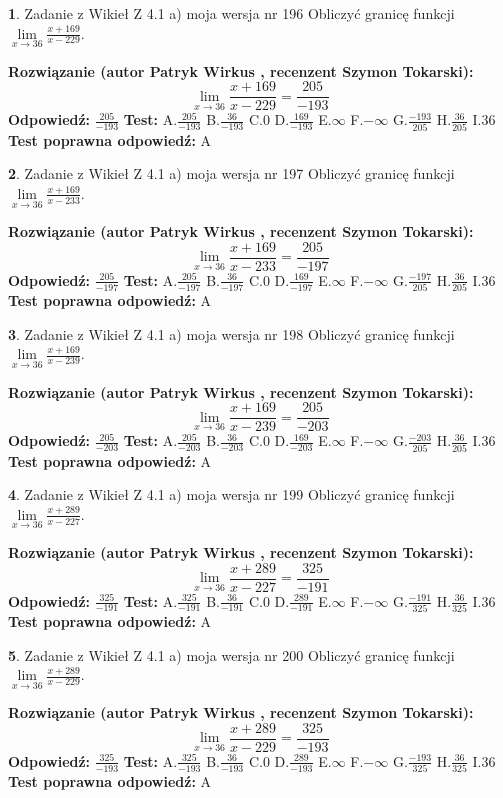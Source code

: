 \documentclass[12pt, a4paper]{article}
\theoremstyle{definition} %
\newtheorem{zad}{}
\newcommand{\zadStart}[1]{\begin{zad}#1\newline}
\newcommand{\zadStop}{\end{zad}}
\newcommand{\rozwStart}[2]{\noindent \textbf{Rozwiązanie (autor #1 , recenzent #2): }\newline}
\newcommand{\rozwStop}{\newline}
\newcommand{\odpStart}{\noindent \textbf{Odpowiedź:}\newline}
\newcommand{\odpStop}{\newline}
\newcommand{\testStart}{\noindent \textbf{Test:}\newline}
\newcommand{\testStop}{\newline}
\newcommand{\kluczStart}{\noindent \textbf{Test poprawna odpowiedź:}\newline}
\newcommand{\kluczStop}{\newline}
\begin{document}
\zadStart{Zadanie z Wikieł Z 4.1 a) moja wersja nr 196}
Obliczyć granicę funkcji $\lim\limits_{x\to36}\frac{x+169}{x-229}$.
\zadStop
\rozwStart{Patryk Wirkus}{Szymon Tokarski}
$$\lim\limits_{x\to36}\frac{x+169}{x-229} = \frac{205}{-193}$$
\rozwStop
\odpStart
$\frac{205}{-193}$
\odpStop
\testStart
A.$\frac{205}{-193}$
B.$\frac{36}{-193}$
C.$0$
D.$\frac{169}{-193}$
E.$\infty$
F.$-\infty$
G.$\frac{-193}{205}$
H.$\frac{36}{205}$
I.$36$
\testStop
\kluczStart
A
\kluczStop



\zadStart{Zadanie z Wikieł Z 4.1 a) moja wersja nr 197}
Obliczyć granicę funkcji $\lim\limits_{x\to36}\frac{x+169}{x-233}$.
\zadStop
\rozwStart{Patryk Wirkus}{Szymon Tokarski}
$$\lim\limits_{x\to36}\frac{x+169}{x-233} = \frac{205}{-197}$$
\rozwStop
\odpStart
$\frac{205}{-197}$
\odpStop
\testStart
A.$\frac{205}{-197}$
B.$\frac{36}{-197}$
C.$0$
D.$\frac{169}{-197}$
E.$\infty$
F.$-\infty$
G.$\frac{-197}{205}$
H.$\frac{36}{205}$
I.$36$
\testStop
\kluczStart
A
\kluczStop



\zadStart{Zadanie z Wikieł Z 4.1 a) moja wersja nr 198}
Obliczyć granicę funkcji $\lim\limits_{x\to36}\frac{x+169}{x-239}$.
\zadStop
\rozwStart{Patryk Wirkus}{Szymon Tokarski}
$$\lim\limits_{x\to36}\frac{x+169}{x-239} = \frac{205}{-203}$$
\rozwStop
\odpStart
$\frac{205}{-203}$
\odpStop
\testStart
A.$\frac{205}{-203}$
B.$\frac{36}{-203}$
C.$0$
D.$\frac{169}{-203}$
E.$\infty$
F.$-\infty$
G.$\frac{-203}{205}$
H.$\frac{36}{205}$
I.$36$
\testStop
\kluczStart
A
\kluczStop



\zadStart{Zadanie z Wikieł Z 4.1 a) moja wersja nr 199}
Obliczyć granicę funkcji $\lim\limits_{x\to36}\frac{x+289}{x-227}$.
\zadStop
\rozwStart{Patryk Wirkus}{Szymon Tokarski}
$$\lim\limits_{x\to36}\frac{x+289}{x-227} = \frac{325}{-191}$$
\rozwStop
\odpStart
$\frac{325}{-191}$
\odpStop
\testStart
A.$\frac{325}{-191}$
B.$\frac{36}{-191}$
C.$0$
D.$\frac{289}{-191}$
E.$\infty$
F.$-\infty$
G.$\frac{-191}{325}$
H.$\frac{36}{325}$
I.$36$
\testStop
\kluczStart
A
\kluczStop



\zadStart{Zadanie z Wikieł Z 4.1 a) moja wersja nr 200}
Obliczyć granicę funkcji $\lim\limits_{x\to36}\frac{x+289}{x-229}$.
\zadStop
\rozwStart{Patryk Wirkus}{Szymon Tokarski}
$$\lim\limits_{x\to36}\frac{x+289}{x-229} = \frac{325}{-193}$$
\rozwStop
\odpStart
$\frac{325}{-193}$
\odpStop
\testStart
A.$\frac{325}{-193}$
B.$\frac{36}{-193}$
C.$0$
D.$\frac{289}{-193}$
E.$\infty$
F.$-\infty$
G.$\frac{-193}{325}$
H.$\frac{36}{325}$
I.$36$
\testStop
\kluczStart
A
\kluczStop
\end{document}
